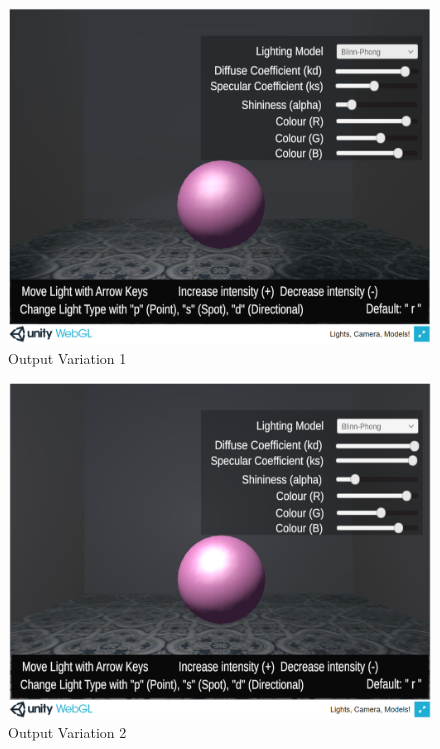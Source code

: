 \documentclass[12pt, titlepage]{article}
\begin{document}
\begin{enumerate}
	\begin{figure}[h]
	\centering
	\includegraphics[scale=0.25]{./images/sphere-lit-blinnphong}
	\caption{Output Variation 1}
	\label{fig:spotlight}
	\end{figure}	
	
	\begin{figure}[h]
		\centering
		\includegraphics[scale=0.25]{./images/sphere-lit-blinnphong-point}
		\caption{Output Variation 2}
		\label{fig:point}
	\end{figure}	
	

\end{enumerate}
\end{document}
